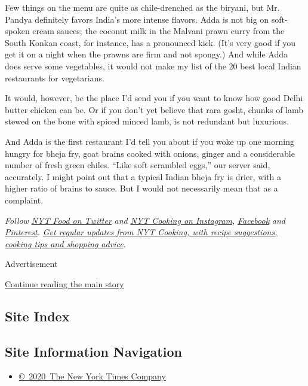 Few things on the menu are quite as chile-drenched as the biryani, but
Mr. Pandya definitely favors India's more intense flavors. Adda is not
big on soft-spoken cream sauces; the coconut milk in the Malvani prawn
curry from the South Konkan coast, for instance, has a pronounced kick.
(It's very good if you get it on a night when the prawns are firm and
not spongy.) And while Adda does serve some vegetables, it would not
make my list of the 20 best local Indian restaurants for vegetarians.

It would, however, be the place I'd send you if you want to know how
good Delhi butter chicken can be. Or if you don't yet believe that rara
gosht, chunks of lamb stewed on the bone with spiced minced lamb, is not
redundant but luxurious.

And Adda is the first restaurant I'd tell you about if you woke up one
morning hungry for bheja fry, goat brains cooked with onions, ginger and
a considerable number of fresh green chiles. ``Like soft scrambled
eggs,'' our server said, accurately. I might point out that a typical
Indian bheja fry is drier, with a higher ratio of brains to sauce. But I
would not necessarily mean that as a complaint.

\emph{Follow} \emph{\href{https://twitter.com/nytfood}{NYT Food on
Twitter}} \emph{and}
\emph{\href{https://www.instagram.com/nytcooking/}{NYT Cooking on
Instagram},}
\emph{\href{https://www.facebookcorewwwi.onion/nytcooking/}{Facebook}}
\emph{and}
\emph{\href{https://www.pinterest.com/nytcooking/}{Pinterest}.}
\emph{\href{https://www.nytimes3xbfgragh.onion/newsletters/cooking}{Get
regular updates from NYT Cooking, with recipe suggestions, cooking tips
and shopping advice}.}

Advertisement

\protect\hyperlink{after-bottom}{Continue reading the main story}

\hypertarget{site-index}{%
\subsection{Site Index}\label{site-index}}

\hypertarget{site-information-navigation}{%
\subsection{Site Information
Navigation}\label{site-information-navigation}}

\begin{itemize}
\tightlist
\item
  \href{https://help.nytimes3xbfgragh.onion/hc/en-us/articles/115014792127-Copyright-notice}{©~2020~The
  New York Times Company}
\end{itemize}

